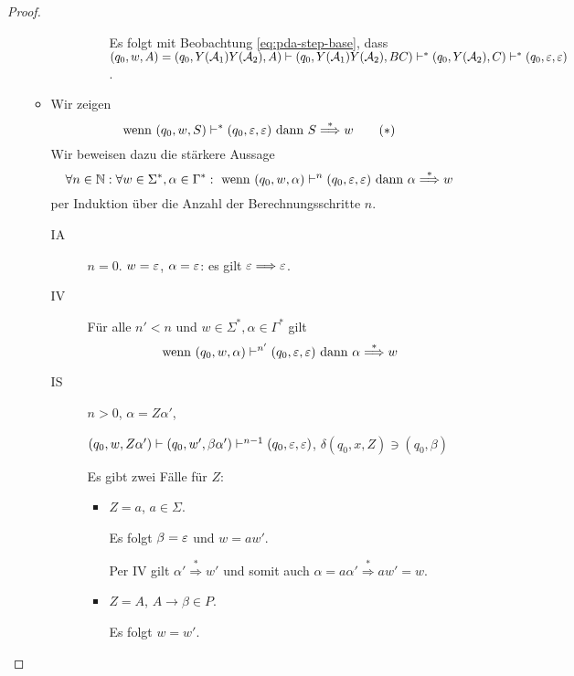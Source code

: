 \begin{proof}
\begin{itemize}
\begin{itemize}
\begin{description}
\begin{itemize}
        Es folgt mit Beobachtung \eqref{eq:pda-step-base}, dass $(q_0, w, A) = (q_0, Y(\mathcal{A}_1)Y(\mathcal{A}_2), A)\vdash (q_0, Y(\mathcal{A}_1)Y(\mathcal{A}_2), BC) \vdash^* (q_0, Y(\mathcal{A}_2), C) \vdash^* (q_0, \varepsilon, \varepsilon)$.
      \end{itemize}
    \end{description}
  \item Wir zeigen
    \begin{equation}
      \label{eq:pda-step-base}
      \text{wenn } (q_0, w, S) \vdash^* (q_0, \varepsilon, \varepsilon) \text{ dann } S \stackrel{*}{\Longrightarrow} w \tag{$*$}
    \end{equation}
    Wir beweisen dazu die stärkere Aussage
    \begin{displaymath}
      \forall n \in \mathbb{N}: \forall w \in \Sigma^*, \alpha \in \Gamma^*: \text{ wenn } (q_0, w, \alpha) \vdash^n (q_0, \varepsilon, \varepsilon) \text{ dann } \alpha \stackrel{*}{\Longrightarrow} w 
    \end{displaymath}
    per Induktion über die Anzahl der Berechnungsschritte $n$.

    \begin{description}
    \item[IA] $n = 0$.
      $w = \varepsilon$, $\alpha = \varepsilon$: es gilt $\varepsilon \Longrightarrow \varepsilon$.
    \item[IV] Für alle $n' < n$ und $w \in \Sigma^*, \alpha \in \Gamma^*$ gilt
      \begin{displaymath}
      \text{ wenn } (q_0, w, \alpha) \vdash^{n'} (q_0, \varepsilon, \varepsilon) \text{ dann } \alpha \stackrel{*}{\Longrightarrow} w
    \end{displaymath}
  \item[IS] $n > 0$, $\alpha = Z\alpha'$,

    $(q_0,w,Z\alpha') \vdash (q_0, w', \beta\alpha') \vdash^{n-1} (q_0, \varepsilon, \varepsilon)$, $\delta(q_0, x, Z) \ni (q_0, \beta)$

    Es gibt zwei Fälle für $Z$:
    \begin{itemize}
    \item $Z = a$, $a \in \Sigma$.

      Es folgt $\beta = \varepsilon$ und $w = aw'$.

      Per IV gilt $\alpha' \stackrel{*}{\Longrightarrow} w'$ und somit auch $\alpha = a\alpha' \stackrel{*}{\Longrightarrow}aw' = w$.
    \item $Z = A$, $A \to \beta \in P$.

      Es folgt $w = w'$.


\end{itemize}
\end{description}
\end{itemize}
\end{itemize}
\end{proof}
